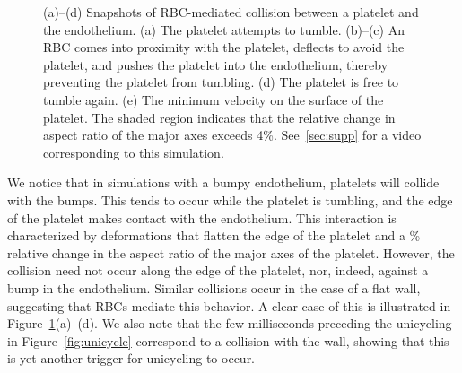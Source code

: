\begin{figure}[th!]
    \vspace{11pt}

    \begin{subfigure}[t]{\textwidth}
    \end{subfigure}
    \caption[RBC-mediated platelet-endothelial collision]{%
(a)--(d) Snapshots of RBC-mediated collision between a platelet and the endothelium. (a)
The platelet attempts to tumble. (b)--(c) An RBC comes into proximity with the platelet,
deflects to avoid the platelet, and pushes the platelet into the endothelium, thereby
preventing the platelet from tumbling. (d) The platelet is free to tumble again. (e) The
minimum velocity on the surface of the platelet. The shaded region indicates that the
relative change in aspect ratio of the major axes exceeds 4\%. See~\ref{sec:supp} for a
video corresponding to this simulation.
    }\label{fig:rbc-plt-endo-collision}
\end{figure}

We notice that in simulations with a bumpy endothelium, platelets will collide with the
bumps. This tends to occur while the platelet is tumbling, and the edge of the platelet
makes contact with the endothelium. This interaction is characterized by deformations
that flatten the edge of the platelet and a \% relative change in the aspect
ratio of the major axes of the platelet. However, the collision need not occur along the
edge of the platelet, nor, indeed, against a bump in the endothelium. Similar collisions
occur in the case of a flat wall, suggesting that RBCs mediate this behavior. A clear
case of this is illustrated in Figure~\ref{fig:rbc-plt-endo-collision}(a)--(d). We also
note that the few milliseconds preceding the unicycling in Figure~\ref{fig:unicycle}
correspond to a collision with the wall, showing that this is yet another trigger for
unicycling to occur.

